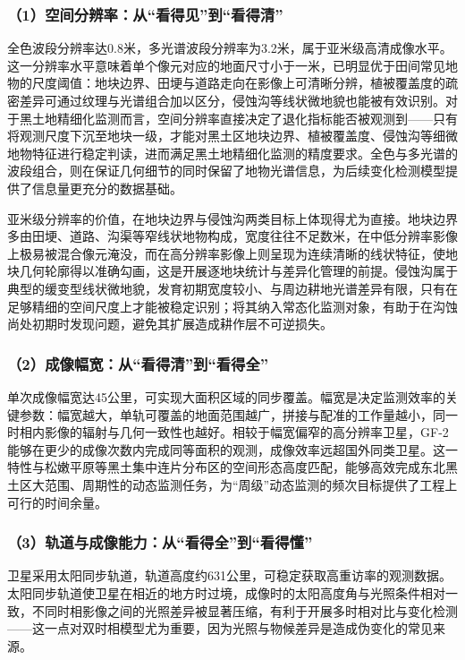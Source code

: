 \documentclass[12pt, a4paper]{ctexart}
\begin{document}
\subsubsection{（1）空间分辨率：从“看得见”到“看得清”}

全色波段分辨率达0.8米，多光谱波段分辨率为3.2米，属于亚米级高清成像水平。这一分辨率水平意味着单个像元对应的地面尺寸小于一米，已明显优于田间常见地物的尺度阈值：地块边界、田埂与道路走向在影像上可清晰分辨，植被覆盖度的疏密差异可通过纹理与光谱组合加以区分，侵蚀沟等线状微地貌也能被有效识别。对于黑土地精细化监测而言，空间分辨率直接决定了退化指标能否被观测到——只有将观测尺度下沉至地块一级，才能对黑土区地块边界、植被覆盖度、侵蚀沟等细微地物特征进行稳定判读，进而满足黑土地精细化监测的精度要求。全色与多光谱的波段组合，则在保证几何细节的同时保留了地物光谱信息，为后续变化检测模型提供了信息量更充分的数据基础。

亚米级分辨率的价值，在地块边界与侵蚀沟两类目标上体现得尤为直接。地块边界多由田埂、道路、沟渠等窄线状地物构成，宽度往往不足数米，在中低分辨率影像上极易被混合像元淹没，而在高分辨率影像上则呈现为连续清晰的线状特征，使地块几何轮廓得以准确勾画，这是开展逐地块统计与差异化管理的前提。侵蚀沟属于典型的缓变型线状微地貌，发育初期宽度较小、与周边耕地光谱差异有限，只有在足够精细的空间尺度上才能被稳定识别；将其纳入常态化监测对象，有助于在沟蚀尚处初期时发现问题，避免其扩展造成耕作层不可逆损失。

\subsubsection{（2）成像幅宽：从“看得清”到“看得全”}

单次成像幅宽达45公里，可实现大面积区域的同步覆盖。幅宽是决定监测效率的关键参数：幅宽越大，单轨可覆盖的地面范围越广，拼接与配准的工作量越小，同一时相内影像的辐射与几何一致性也越好。相较于幅宽偏窄的高分辨率卫星，GF-2能够在更少的成像次数内完成同等面积的观测，成像效率远超国外同类卫星。这一特性与松嫩平原等黑土集中连片分布区的空间形态高度匹配，能够高效完成东北黑土区大范围、周期性的动态监测任务，为“周级”动态监测的频次目标提供了工程上可行的时间余量。

\subsubsection{（3）轨道与成像能力：从“看得全”到“看得懂”}

卫星采用太阳同步轨道，轨道高度约631公里，可稳定获取高重访率的观测数据。太阳同步轨道使卫星在相近的地方时过境，成像时的太阳高度角与光照条件相对一致，不同时相影像之间的光照差异被显著压缩，有利于开展多时相对比与变化检测——这一点对双时相模型尤为重要，因为光照与物候差异是造成伪变化的常见来源。
\end{document}

